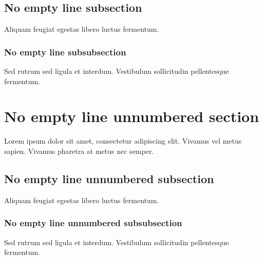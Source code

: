 \documentclass[10pt]{extarticle}
\begin{document}
\subsection{No empty line subsection}

Aliquam feugiat egestas libero luctus fermentum. 

\subsubsection{No empty line subsubsection}

Sed rutrum sed ligula et interdum. Vestibulum sollicitudin pellentesque fermentum.

\section{No empty line unnumbered section}

Lorem ipsum dolor sit amet, consectetur adipiscing elit. Vivamus vel metus sapien. Vivamus pharetra at metus nec semper. 

\subsection{No empty line unnumbered subsection}

Aliquam feugiat egestas libero luctus fermentum. 

\subsubsection{No empty line unnumbered subsubsection}

Sed rutrum sed ligula et interdum. Vestibulum sollicitudin pellentesque fermentum.

\end{document}
